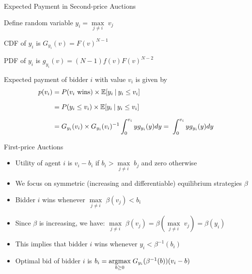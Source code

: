 \documentclass[11pt,aspectratio=169]{beamer}
\begin{document}
  \begin{frame}{Expected Payment in Second-price Auctions}
   \begin{itemizes}[1em]
    \item Define random variable $y_i = \underset{j \ne i}{\max} \; v_j$
    \begin{itemizes}[0.7em]
     \item CDF of $y_i$ is $G_{y_i}(v) = F(v)^{N-1}$
     \item PDF of $y_i$ is $g_{y_i}(v) = (N-1)f(v)F(v)^{N-2}$
    \end{itemizes}
    \item Expected payment of bidder $i$ with value $v_i$ is given by
    \begin{align*}
     p(v_i) &= P(v_i\text{ wins})\times \mathbb{E}[y_i \:\vert\: y_i\le v_i]\\[0.7em]
     &= P(y_i\le v_i)\times \mathbb{E}[y_i \:\vert\: y_i\le v_i]\\[0.7em]
     &= G_{y_i}(v_i)\times G_{y_i}(v_i)^{-1}\int_0^{v_i}yg_{y_i}(y)dy = \; \int_0^{v_i}yg_{y_i}(y)dy
    \end{align*}
   \end{itemizes}
  \end{frame}
  
  
  \begin{frame}{First-price Auctions}
   \begin{itemize}[<+->]
   \setlength{\itemsep}{0.8em}
    \item Utility of agent $i$ is $v_i-b_i$ if $b_i > \underset{j\ne i}{\max} \; b_j$ and zero otherwise
    \item We focus on symmetric (increasing and differentiable) equilibrium strategies $\beta$
    \item Bidder $i$ wins whenever $\underset{j\ne i}{\max} \; \beta(v_j) < b_i$
    \item Since $\beta$ is increasing, we have: $\underset{j\ne i}{\max} \; \beta(v_j) = \beta(\underset{j\ne i}{\max} \; v_j) = \beta (y_i)$
    \item This implies that bidder $i$ wins whenever $y_i < \beta^{-1}(b_i)$
    \item Optimal bid of bidder $i$ is $b_i = \underset{b \ge 0}{\operatorname*{argmax}} \; G_{y_i} (\beta^{-1}(b))(v_i - b)$
   \end{itemize}
  \end{frame}
\end{document}
